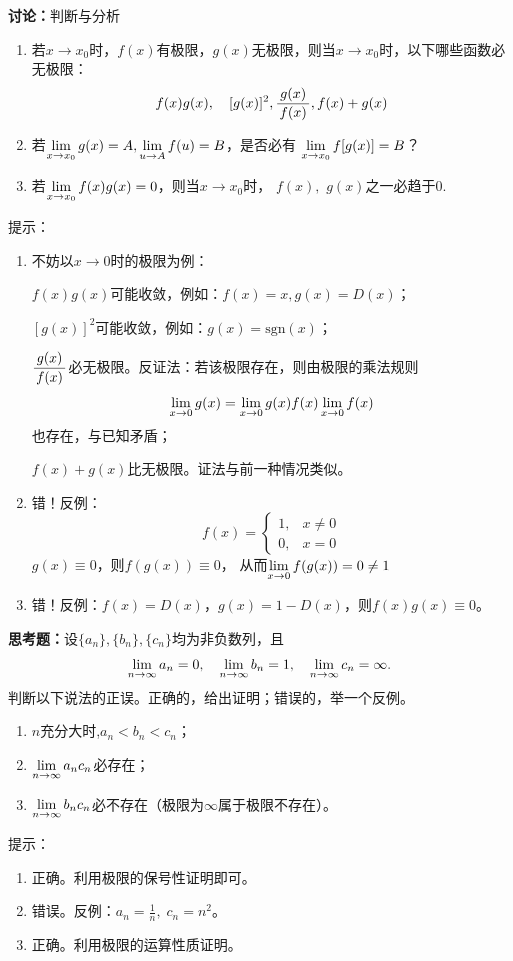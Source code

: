 \bs

{\bf 讨论：}判断与分析
\begin{enumerate}[(1)]
  \setlength{\itemindent}{1cm}
  \item 若$x\to x_0$时，$f(x)$有极限，$g(x)$无极限，则当$x\to x_0$时，以下哪些函数必无极限：
  $$f(x)g(x),\quad [g(x)]^2,\displaystyle\frac{\,{g(x)}\,}{\,{f(x)}\,}, f(x)+g(x)$$ 
  \item 若$\lim\limits_{x\to{x_0}}g(x)=A,\lim\limits_{u\to A}f(u)=B$，是否必有
  $\lim\limits_{x\to{x_0}}f[g(x)]=B$？
  \item 若$\lim\limits_{x\to{x_0}}f(x)g(x)=0$，则当$x\to
  x_0$时， $f(x),$ $g(x)$之一必趋于$0$.
\end{enumerate}

\ifhint
提示：
\begin{enumerate}[(1)]
  \setlength{\itemindent}{1cm}
	\item 不妨以$x\to0$时的极限为例：

	\quad$f(x)g(x)$可能收敛，例如：$f(x)=x,g(x)=D(x)$；

	\quad$[g(x)]^2$可能收敛，例如：$g(x)=\mathrm{sgn}(x)$；

	\quad$\displaystyle\frac{\,{g(x)}\,}{\,{f(x)}\,}$必无极限。反证法：若该极限存在，则由极限的乘法规则
	$$\lim\limits_{x\to{0}}g(x)=\lim\limits_{x\to{0}}{g(x)}{f(x)}\lim\limits_{x\to{0}}f(x)$$
	也存在，与已知矛盾；

	\quad$f(x)+g(x)$比无极限。证法与前一种情况类似。
	\item 错！反例：
	$$f(x)=\left\{\begin{array}{ll}
	  1,&x\ne0\\0,&x=0
	\end{array}\right.$$
	\quad$g(x)\equiv 0$，则$f(g(x))\equiv0$，
	从而$\lim\limits_{x\to{0}}f(g(x))=0\ne 1$
	\item 错！反例：$f(x)=D(x)$，$g(x)=1-D(x)$，则$f(x)g(x)\equiv 0$。
	\fin
\end{enumerate}
\fi

{\bf 思考题：}设$\{a_n\},\{b_n\},\{c_n\}$均为非负数列，且
  $$\lim\limits_{n\to\infty} a_n=0,\quad \lim\limits_{n\to\infty} b_n=1,\quad \lim\limits_{n\to\infty} c_n=\infty.$$
  判断以下说法的正误。正确的，给出证明；错误的，举一个反例。
  \begin{enumerate}[(1)]
  	\setlength{\itemindent}{1cm}
    \item $n$充分大时,$a_n<b_n<c_n$；
    \item $\lim\limits_{n\to\infty} a_nc_n$必存在；
    \item $\lim\limits_{n\to\infty} b_nc_n$必不存在（极限为$\infty$属于极限不存在）。
  \end{enumerate}

\ifhint
提示：
\begin{enumerate}[(1)]
	\setlength{\itemindent}{1cm}
	\item 正确。利用极限的保号性证明即可。
	\item 错误。反例：$a_n=\frac1n,\;c_n=n^2$。
	\item 正确。利用极限的运算性质证明。
\end{enumerate}
\fi

